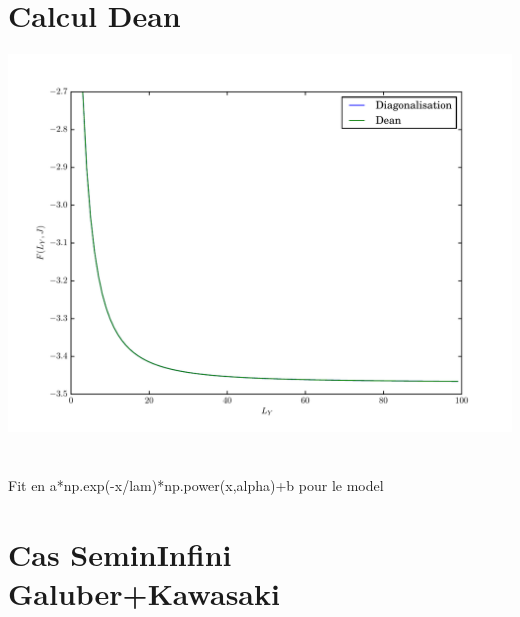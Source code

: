 \section{Calcul Dean}

\includegraphics{resultat/nullmag.pdf}

\section{}

Fit en  a*np.exp(-x/lam)*np.power(x,alpha)+b pour le model 

\section{Cas SeminInfini Galuber+Kawasaki}

